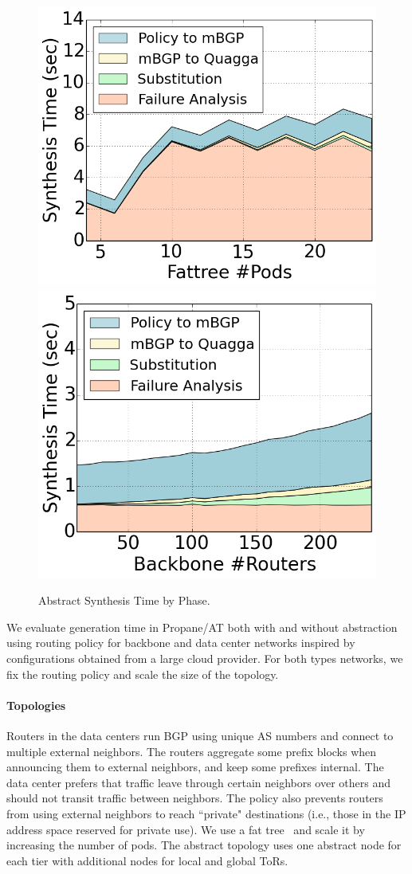 \documentclass[numbers, 10pt]{sigplanconf}
\newcommand{\sysname}{{\text{}\small \sf Propane/AT}\xspace}
\newcommand{\para}[1]{\paragraph*{\textbf{#1}}}
\begin{document}
\begin{figure}[t!]
    {\includegraphics[width=.49\columnwidth]{figures/Fattree-analysis-time.png}}
    {\includegraphics[width=.49\columnwidth]{figures/backbone-analysis-time.png}} \\
  \vspace{-.6em}
  \caption{Abstract Synthesis Time by Phase. \label{fig:abstract-breakdown}}
  \vspace{-.4em}
\end{figure}


We evaluate generation time in \sysname both with and without abstraction using routing policy for backbone and data center networks inspired by configurations obtained from a large cloud provider. For both types networks, we fix the routing policy and scale the size of the topology.


\para{Topologies}

Routers in the data centers run BGP using unique AS numbers and connect to multiple external neighbors. The routers aggregate some prefix blocks when announcing them to external neighbors, and keep some prefixes internal. The data center prefers that traffic leave through certain neighbors over others and should not transit traffic between neighbors. The policy also prevents routers from using external neighbors to reach ``private" destinations  (i.e., those in the IP address space reserved for private use).
%
We use a fat tree~\cite{fattree} and scale it by increasing the number of pods. The abstract topology uses one abstract node for each tier with additional nodes for local and global ToRs.
\end{document}
